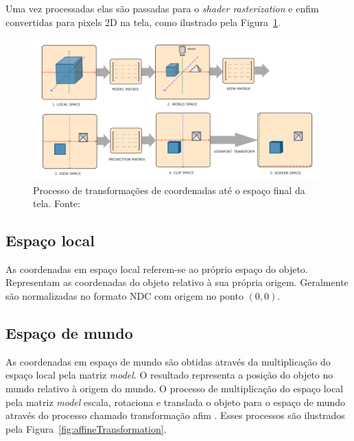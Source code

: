 \documentclass[12pt, 
openright, 
oneside, 
a4paper,    
brazil]{facom-ufu-abntex2}
\begin{document}
Uma vez processadas elas são passadas para o \textit{shader rasterization} e enfim convertidas para pixels 2D na tela, como ilustrado pela Figura~\ref{fig:coordSpace}.

\begin{figure}[H]
	\centering
	\includegraphics[width=30em]{imagens/coordSpace.png}
	\caption{Processo de transformações de coordenadas até o espaço final da tela. Fonte:~\cite{LearnOpenGL}}
	\label{fig:coordSpace}
\end{figure}

\subsection{Espaço local}
As coordenadas em espaço local referem-se ao próprio espaço do objeto. Representam as coordenadas do objeto relativo à sua própria origem. Geralmente são normalizadas no formato NDC com origem no ponto $(0,0)$.


\subsection{Espaço de mundo}
As coordenadas em espaço de mundo são obtidas através da multiplicação do espaço local pela matriz \textit{model}. O resultado representa a posição do objeto no mundo relativo à origem do mundo. O processo de multiplicação do espaço local pela matriz \textit{model} escala, rotaciona e translada o objeto para o espaço de mundo através do processo chamado transformação afim \cite{AffineTransformation}. Esses processos são ilustrados pela Figura~\ref{fig:affineTransformation}.
\end{document}
